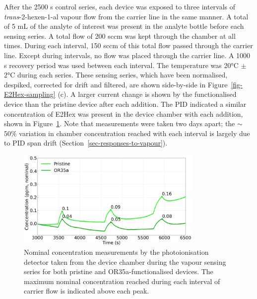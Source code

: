\documentclass[
  a4paper,
]{scrbook}
\begin{document}
After the 2500 s control series, each device was exposed to three
intervals of \emph{trans}-2-hexen-1-al vapour flow from the carrier line
in the same manner. A total of 5 mL of the analyte of interest was
present in the analyte bottle before each sensing series. A total flow
of 200 sccm was kept through the chamber at all times. During each
interval, 150 sccm of this total flow passed through the carrier line.
Except during intervals, no flow was placed through the carrier line. A
1000 s recovery period was used between each interval. The temperature
was 20°C \(\pm\) 2°C during each series. These sensing series, which
have been normalised, despiked, corrected for drift and filtered, are
shown side-by-side in Figure~\ref{fig-E2Hex-sampling} (c). A larger
current change is shown by the functionalised device than the pristine
device after each addition. The PID indicated a similar concentration of
E2Hex was present in the device chamber with each addition, shown in
Figure~\ref{fig-E2Hex-additions-PID}. Note that measurements were taken
two days apart; the \(\sim\) 50\% variation in chamber concentration
reached with each interval is largely due to PID span drift
(Section~\ref{sec-responses-to-vapour}).

\begin{figure}

{\centering \includegraphics[width=0.8\textwidth,height=\textheight]{figures/ch9/input_time_comparison.png}

}

\caption{\label{fig-E2Hex-additions-PID}Nominal concentration
measurements by the photoionisation detector taken from the device
chamber during the vapour sensing series for both pristine and
OR35a-functionalised devices. The maximum nominal concentration reached
during each interval of carrier flow is indicated above each peak.}

\end{figure}
\end{document}
